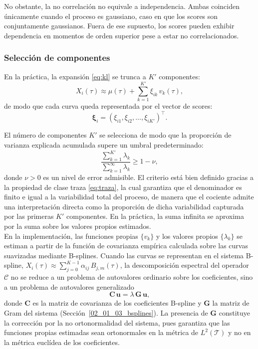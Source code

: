 No obstante, la no correlación no equivale a independencia. Ambas coinciden únicamente cuando el proceso es gaussiano, caso en que los scores son conjuntamente gaussianos. Fuera de ese supuesto, los scores pueden exhibir dependencia en momentos de orden superior pese a estar no correlacionados.

\subsubsection{Selección de componentes}
\label{02_01_04_03_truncamiento_componentes}
En la práctica, la expansión \eqref{eq:kl} se trunca a $K'$ componentes:
\begin{equation}\label{eq:kl_truncada}
    X_i(\tau) \approx \mu(\tau) +
    \sum_{k=1}^{K'} \xi_{ik}\, v_k(\tau),
\end{equation}
de modo que cada curva queda representada por el vector de scores:
\begin{equation}
    \boldsymbol{\xi}_i =
    (\xi_{i1}, \xi_{i2}, \dots, \xi_{iK'})^\top.
\end{equation}

El número de componentes $K'$ se selecciona de modo que la proporción de varianza explicada acumulada supere un umbral predeterminado:
\begin{equation}\label{eq:var_explicada}
    \frac{\sum_{k=1}^{K'} \lambda_k}{\sum_{k=1}^{\infty} \lambda_k}
    \geq 1 - \nu,
\end{equation}
donde $\nu > 0$ es un nivel de error admisible. El criterio está bien definido gracias a la propiedad de clase traza \eqref{eq:traza}, la cual garantiza que el denominador es finito e igual a la variabilidad total del proceso, de manera que el cociente admite una interpretación directa como la proporción de dicha variabilidad capturada por las primeras $K'$ componentes. En la práctica, la suma infinita se aproxima por la suma sobre los valores propios estimados.\\

En la implementación, las funciones propias $\{v_k\}$ y los valores propios $\{\lambda_k\}$ se estiman a partir de la función de covarianza empírica calculada sobre las curvas suavizadas mediante B-splines. Cuando las curvas se representan en el sistema B-spline, $X_i(\tau) \approx \sum_{j=0}^{K-1} \alpha_{ij}\, B_{j,m}(\tau)$, la descomposición espectral del operador $\mathcal{C}$ no se reduce a un problema de autovalores ordinario sobre los coeficientes, sino a un problema de autovalores generalizado
\begin{equation}\label{eq:eigen_generalizado}
    \mathbf{C}\,\mathbf{u} = \lambda\,\mathbf{G}\,\mathbf{u},
\end{equation}
donde $\mathbf{C}$ es la matriz de covarianza de los coeficientes B-spline y $\mathbf{G}$ la matriz de Gram del sistema (Sección~\ref{02_01_03_bsplines}). La presencia de $\mathbf{G}$ constituye la corrección por la no ortonormalidad del sistema, pues garantiza que las funciones propias estimadas sean ortonormales en la métrica de $L^2(\mathcal{T})$ y no en la métrica euclídea de los coeficientes.\\

